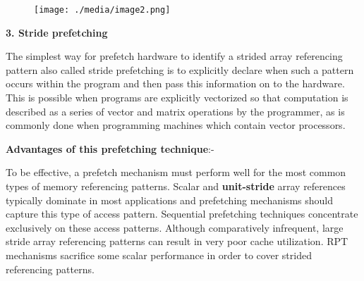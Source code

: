 \documentclass[12pt]{article}
\begin{document}
\vspace{\baselineskip}



\begin{figure}[H]
	\begin{Center}
		\texttt{[image: ./media/image2.png]}
	\end{Center}
\end{figure}



\par


\vspace{\baselineskip}
{\fontsize{18pt}{21.6pt}\selectfont \textbf{\textcolor[HTML]{222222}{3. Stride prefetching}}\par}\par


\vspace{\baselineskip}
{\fontsize{15pt}{18.0pt}\selectfont The simplest way for prefetch hardware to identify a strided array referencing pattern also called stride prefetching is to explicitly declare when such a pattern occurs within the program and then pass this information on to the hardware. This is possible when programs are explicitly vectorized so that computation is described as a series of vector and matrix operations by the programmer, as is commonly done when programming machines which contain vector processors.\par}\par


\vspace{\baselineskip}
{\fontsize{15pt}{18.0pt}\selectfont \textbf{Advantages of this prefetching technique}:-\par}\par

{\fontsize{15pt}{18.0pt}\selectfont To be effective, a prefetch mechanism must perform well for the most common types of memory referencing patterns. Scalar and\textbf{ unit-stride }array references typically dominate in most applications and prefetching mechanisms should capture this type of access pattern. Sequential prefetching techniques concentrate exclusively on these access patterns. Although comparatively infrequent, large stride array referencing patterns can result in very poor cache utilization. RPT mechanisms sacrifice some scalar performance in order to cover strided referencing patterns. \par}\par
\end{document}
